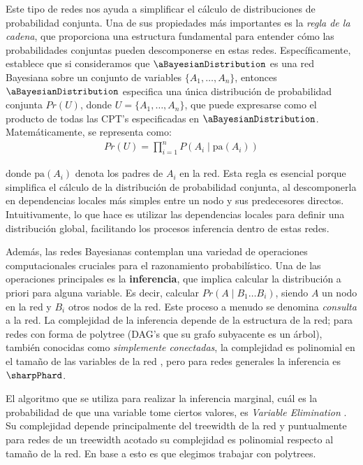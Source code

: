  
Este tipo de redes nos ayuda a simplificar el cálculo de distribuciones de probabilidad conjunta. Una de sus propiedades más importantes es la \emph{regla de la cadena}, que proporciona una estructura fundamental para entender cómo las probabilidades conjuntas pueden descomponerse en estas redes. Específicamente, establece que si consideramos que $\aBayesianDistribution$ es una red Bayesiana sobre un conjunto de variables \( \{A_1, \dots, A_n\} \), entonces $\aBayesianDistribution$ especifica una única distribución de probabilidad conjunta \( Pr(U) \), donde \( U = \{A_1, \dots, A_n\} \), que puede expresarse como el producto de todas las CPT's especificadas en $\aBayesianDistribution$. Matemáticamente, se representa como:
\begin{align}\label{eq:bayesian_probability}
    Pr(U) = \prod_{i=1}^{n} P(A_i \mid \text{pa}(A_i))    
\end{align}

donde \( \text{pa}(A_i) \)  denota los padres de \( A_i \) en la red. Esta regla es esencial porque simplifica el cálculo de la distribución de probabilidad conjunta, al descomponerla en dependencias locales más simples entre un nodo y sus predecesores directos. Intuitivamente, lo que hace es utilizar las dependencias locales para definir una distribución global, facilitando los procesos inferencia dentro de estas redes.


Además, las redes Bayesianas contemplan una variedad de operaciones computacionales cruciales para el razonamiento probabilístico. Una de las operaciones principales es la \textbf{inferencia}, que implica calcular la distribución a priori para alguna variable. Es decir, calcular $Pr(A \mid B_1  \dots B_i)$, siendo $A$ un nodo en la red y $B_i$ otros nodos de la red. Este proceso a menudo se denomina \emph{consulta} a la red. La complejidad de la inferencia depende de la estructura de la red; para redes con forma de polytree (DAG's que su grafo subyacente es un árbol), también conocidas como \emph{simplemente conectadas}, la complejidad es polinomial en el tamaño de las variables de la red \cite{pearl1986bayesianInference}, pero para redes generales la inferencia es $\sharpPhard$. 


El algoritmo que se utiliza  para realizar la inferencia marginal, cuál es la probabilidad de que una variable tome ciertos valores, es \emph{Variable Elimination} \cite{variableElimination}. Su complejidad depende principalmente del treewidth de la red y puntualmente para redes de un treewidth acotado su complejidad es polinomial respecto al tamaño de la red. En base a esto es que elegimos trabajar con polytrees. 

